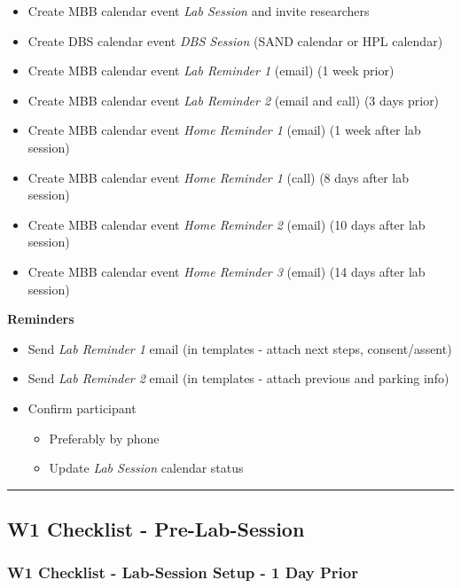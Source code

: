 \documentclass[
]{book}
\providecommand{\tightlist}{%
  \setlength{\itemsep}{0pt}\setlength{\parskip}{0pt}}
\begin{document}
\begin{itemize}
\tightlist
\item
  Create MBB calendar event \emph{Lab Session} and invite researchers
\item
  Create DBS calendar event \emph{DBS Session} (SAND calendar or HPL calendar)
\item
  Create MBB calendar event \emph{Lab Reminder 1} (email) (1 week prior)
\item
  Create MBB calendar event \emph{Lab Reminder 2} (email and call) (3 days prior)
\item
  Create MBB calendar event \emph{Home Reminder 1} (email) (1 week after lab session)
\item
  Create MBB calendar event \emph{Home Reminder 1} (call) (8 days after lab session)
\item
  Create MBB calendar event \emph{Home Reminder 2} (email) (10 days after lab session)
\item
  Create MBB calendar event \emph{Home Reminder 3} (email) (14 days after lab session)
\end{itemize}

\textbf{Reminders}

\begin{itemize}
\tightlist
\item
  Send \emph{Lab Reminder 1} email (in templates - attach next steps, consent/assent)
\item
  Send \emph{Lab Reminder 2} email (in templates - attach previous and parking info)
\item
  Confirm participant

  \begin{itemize}
  \tightlist
  \item
    Preferably by phone
  \item
    Update \emph{Lab Session} calendar status
  \end{itemize}
\end{itemize}

\begin{center}\rule{0.5\linewidth}{0.5pt}\end{center}

\hypertarget{w1-checklist---pre-lab-session}{%
\subsection{W1 Checklist - Pre-Lab-Session}\label{w1-checklist---pre-lab-session}}

\hypertarget{w1-checklist---lab-session-setup---1-day-prior}{%
\subsubsection{W1 Checklist - Lab-Session Setup - 1 Day Prior}\label{w1-checklist---lab-session-setup---1-day-prior}}
\end{document}
